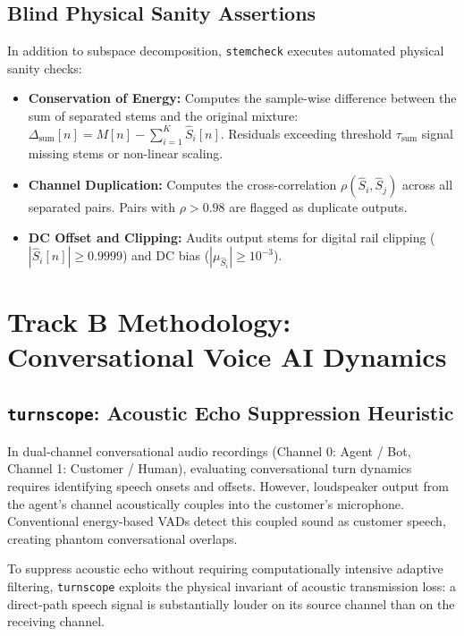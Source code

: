 \documentclass[10pt,journal,compsoc]{IEEEtran}
\begin{document}
\subsection{Blind Physical Sanity Assertions}
In addition to subspace decomposition, \texttt{stemcheck} executes automated physical sanity checks:
\begin{itemize}
    \item \textbf{Conservation of Energy:} Computes the sample-wise difference between the sum of separated stems and the original mixture: $\Delta_{\text{sum}}[n] = M[n] - \sum_{i=1}^K \hat{S}_i[n]$. Residuals exceeding threshold $\tau_{\text{sum}}$ signal missing stems or non-linear scaling.
    \item \textbf{Channel Duplication:} Computes the cross-correlation $\rho(\hat{S}_i, \hat{S}_j)$ across all separated pairs. Pairs with $\rho > 0.98$ are flagged as duplicate outputs.
    \item \textbf{DC Offset and Clipping:} Audits output stems for digital rail clipping ($|\hat{S}_i[n]| \ge 0.9999$) and DC bias ($|\mu_{\hat{S}_i}| \ge 10^{-3}$).
\end{itemize}

\section{Track B Methodology: Conversational Voice AI Dynamics}

\subsection{\texttt{turnscope}: Acoustic Echo Suppression Heuristic}
In dual-channel conversational audio recordings (Channel 0: Agent / Bot, Channel 1: Customer / Human), evaluating conversational turn dynamics requires identifying speech onsets and offsets. However, loudspeaker output from the agent's channel acoustically couples into the customer's microphone. Conventional energy-based VADs detect this coupled sound as customer speech, creating phantom conversational overlaps.

To suppress acoustic echo without requiring computationally intensive adaptive filtering, \texttt{turnscope} exploits the physical invariant of acoustic transmission loss: a direct-path speech signal is substantially louder on its source channel than on the receiving channel.
\end{document}

